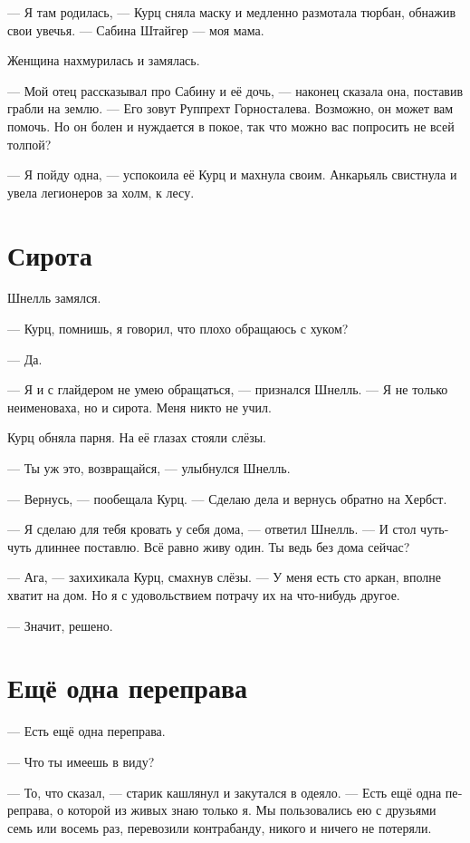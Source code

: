 \documentclass[a4paper,12pt,fleqn]{book}\usepackage{polyglossia}\setdefaultlanguage[babelshorthands=true]{russian}\setotherlanguage{english}\defaultfontfeatures{Ligatures=TeX,Mapping=tex-text}\usepackage{xcolor}\newcommand{\ml}[3]{#2}
\begin{document}
--- Я там родилась, --- Курц сняла маску и медленно размотала тюрбан, обнажив свои увечья.
--- Сабина Штайгер --- моя мама.

Женщина нахмурилась и замялась.

--- Мой отец рассказывал про Сабину и её дочь, --- наконец сказала она, поставив грабли на землю.
\ml{$0$}
{--- Его зовут Руппрехт Горносталева.}
{``His name is Rupprecht Gornostalewa.}
Возможно, он может вам помочь.
Но он болен и нуждается в покое, так что можно вас попросить не всей толпой?

--- Я пойду одна, --- успокоила её Курц и махнула своим.
Анкарьяль свистнула и увела легионеров за холм, к лесу.

\section{Сирота}

Шнелль замялся.

--- Курц, помнишь, я говорил, что плохо обращаюсь с хуком?

--- Да.

--- Я и с глайдером не умею обращаться, --- признался Шнелль.
--- Я не только неименоваха, но и сирота.
Меня никто не учил.

Курц обняла парня.
На её глазах стояли слёзы.

--- Ты уж это, возвращайся, --- улыбнулся Шнелль.

--- Вернусь, --- пообещала Курц.
--- Сделаю дела и вернусь обратно на Хербст.

--- Я сделаю для тебя кровать у себя дома, --- ответил Шнелль.
--- И стол чуть-чуть длиннее поставлю.
Всё равно живу один.
Ты ведь без дома сейчас?

--- Ага, --- захихикала Курц, смахнув слёзы.
--- У меня есть сто аркан, вполне хватит на дом.
Но я с удовольствием потрачу их на что-нибудь другое.

--- Значит, решено.

\section{Ещё одна переправа}

--- Есть ещё одна переправа.

--- Что ты имеешь в виду?

--- То, что сказал, --- старик кашлянул и закутался в одеяло.
--- Есть ещё одна переправа, о которой из живых знаю только я.
Мы пользовались ею с друзьями семь или восемь раз, перевозили контрабанду, никого и ничего не потеряли.
\end{document}
